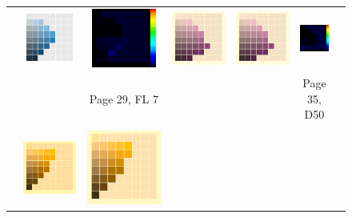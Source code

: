 \begin{figure}[ht!]
{\begin{tabular}{ccccccc}
			&
			\includegraphics[width=.15\linewidth]{img/results_uplift_page29_ourFL7.png}
			& 
			\includegraphics[width=.15\linewidth,height=5.25em]{img/results_uplift_page29_diff_ourFL7.png}
			&\quad
			\includegraphics[width=.15\linewidth]{img/results_uplift_page35_originalD50.png}
			&
			\includegraphics[width=.15\linewidth]{img/results_uplift_page35_ourD50.png}
			&
			\includegraphics[width=.15\linewidth,height=5.25em]{img/results_uplift_page35_diff_ourD50.png}\\
			& & Page 29, FL 7 & & & Page 35, D50 & \\
			\vspace{0.1em} \\ 
			\raisebox{0.4cm}[0pt][0pt]{\parbox[c][0pt][c]{0cm}{\hspace{-1.5em}\\[20pt]}\par}
			&\includegraphics[width=.15\linewidth]{img/results_uplift_page09_originalFL11.png}
			&
			\includegraphics[width=.15\linewidth]{img/results_uplift_page09_sigmoidFL11.png}

\end{tabular}}
\end{figure}
